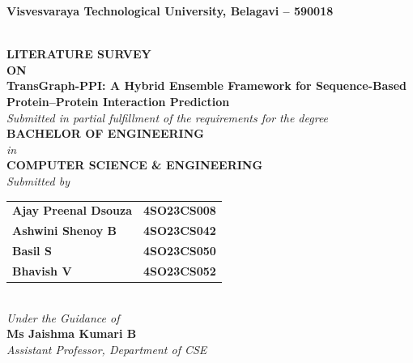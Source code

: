 \documentclass[12pt,a4paper]{report}
\begin{document}
\begin{titlepage}
    \begin{center}
        {\Large \textbf{Visvesvaraya Technological University, Belagavi – 590018}} \\[1.5cm]
        
         \\[1cm]

        {\Large \textbf{LITERATURE SURVEY}} \\[0.5cm]
        {\Large \textbf{ON}} \\[0.5cm]
        {\Large \textbf{TransGraph-PPI: A Hybrid Ensemble Framework for Sequence-Based Protein–Protein Interaction Prediction}} \\[1.5cm]

        \textit{Submitted in partial fulfillment of the requirements for the degree} \\[0.2cm]
        {\large \textbf{BACHELOR OF ENGINEERING}} \\[0.2cm]
        \textit{in} \\[0.2cm]
        {\large \textbf{COMPUTER SCIENCE \& ENGINEERING}} \\[1.5cm]

        \textit{Submitted by} \\[0.5cm]
        \begin{tabular}{ll}
            \textbf{Ajay Preenal Dsouza} & \textbf{4SO23CS008} \\
            \textbf{Ashwini Shenoy B} & \textbf{4SO23CS042} \\
            \textbf{Basil S} & \textbf{4SO23CS050} \\
            \textbf{Bhavish V} & \textbf{4SO23CS052} \\
        \end{tabular} \\[1cm]

        \textit{Under the Guidance of} \\[0.2cm]
        {\large \textbf{Ms Jaishma Kumari B}} \\[0.1cm]
        \textit{Assistant Professor, Department of CSE} \\[1cm]


\end{center}
\end{titlepage}
\end{document}

